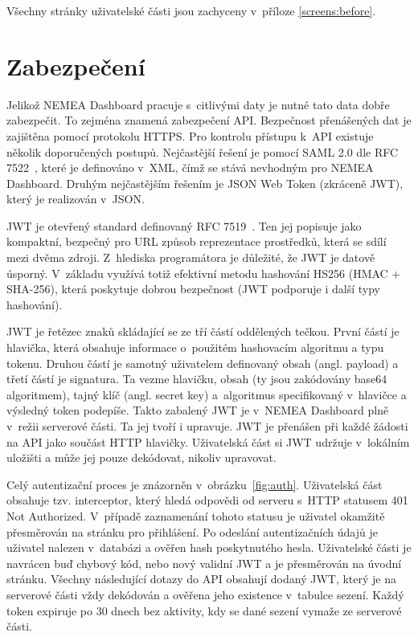 Všechny stránky uživatelské části jsou zachyceny v~příloze \ref{screens:before}.

\section{Zabezpečení}
\label{zabezpeceni}

Jelikož NEMEA Dashboard pracuje s~citlivými daty je nutné tato data dobře zabezpečit. To zejména znamená zabezpečení API. Bezpečnost přenášených dat je zajištěna pomocí protokolu HTTPS. Pro kontrolu přístupu k~API existuje několik doporučených postupů. Nejčastější řešení je pomocí SAML 2.0 dle RFC 7522~\cite{rfc:saml}, které je definováno v~XML, čímž se stává nevhodným pro NEMEA Dashboard. Druhým nejčastějším řešením je JSON Web Token (zkráceně JWT), který je realizován v~JSON.

JWT je otevřený standard definovaný RFC 7519~\cite{rfc:jwt}. Ten jej popisuje jako kompaktní, bezpečný pro URL způsob reprezentace prostředků, která se sdílí mezi dvěma zdroji. Z~hlediska programátora je důležité, že JWT je datově úsporný. V~základu využívá totiž efektivní metodu hashování HS256 (HMAC + SHA-256), která poskytuje dobrou bezpečnost (JWT podporuje i další typy hashování).

JWT je řetězec znaků skládající se ze tří částí oddělených tečkou. První částí je hlavička, která obsahuje informace o~použitém hashovacím algoritmu a typu tokenu. Druhou částí je samotný uživatelem definovaný obsah (angl. payload) a třetí částí je signatura. Ta vezme hlavičku, obsah (ty jsou zakódovány base64 algoritmem), tajný klíč (angl. secret key) a~algoritmus specifikovaný v~hlavičce a výsledný token podepíše. Takto zabalený JWT je v~NEMEA Dashboard plně v~režii serverové části. Ta jej tvoří i upravuje. JWT je přenášen při každé žádosti na API jako součást HTTP hlavičky. Uživatelská část si JWT udržuje v~lokálním uložišti a může jej pouze dekódovat, nikoliv upravovat.

Celý autentizační proces je znázorněn v~obrázku~\ref{fig:auth}. Uživatelská část obsahuje tzv. interceptor, který hledá odpovědi od serveru s~HTTP statusem 401 Not Authorized. V~případě zaznamenání tohoto statusu je uživatel okamžitě přesměrován na stránku pro přihlášení. Po odeslání autentizačních údajů je uživatel nalezen v~databázi a ověřen hash poskytnutého hesla. Uživatelské části je navrácen buď chybový kód, nebo nový validní JWT a je přesměrován na úvodní stránku. Všechny následující dotazy do API obsahují dodaný JWT, který je na serverové části vždy dekódován a ověřena jeho existence v~tabulce sezení. Každý token expiruje po 30 dnech bez aktivity, kdy se dané sezení vymaže ze serverové části.

